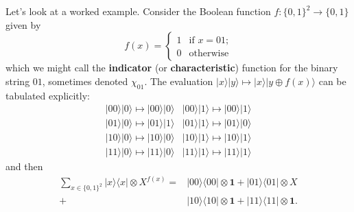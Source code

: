 \documentclass[fleqn,a4paper]{article}
\theoremstyle{definition}
\theoremstyle{definition}
\theoremstyle{definition}
\theoremstyle{definition}
\theoremstyle{remark}
\begin{document}
Let's look at a worked example.
Consider the Boolean function \(f\colon\{0,1\}^2\to\{0,1\}\) given by
\[
  f(x)
  = \begin{cases}
    1 &\text{if $x=01$;}
  \\0 &\text{otherwise}
  \end{cases}
\]
which we might call the \textbf{indicator} (or \textbf{characteristic}) function for the binary string \(01\), sometimes denoted \(\chi_{01}\).
The evaluation \(|x\rangle|y\rangle \mapsto |x\rangle|y\oplus f(x)\rangle\) can be tabulated explicitly:
\[
  \begin{array}{cc}
    |00\rangle|0\rangle \longmapsto |00\rangle|0\rangle
    & |00\rangle|1\rangle \longmapsto |00\rangle|1\rangle
  \\|01\rangle|0\rangle \longmapsto |01\rangle|1\rangle
    & |01\rangle|1\rangle \longmapsto |01\rangle|0\rangle
  \\|10\rangle|0\rangle \longmapsto |10\rangle|0\rangle
    & |10\rangle|1\rangle \longmapsto |10\rangle|1\rangle
  \\|11\rangle|0\rangle \longmapsto |11\rangle|0\rangle
    & |11\rangle|1\rangle \longmapsto |11\rangle|1\rangle
  \end{array}
\]
and then
\[
  \begin{aligned}
    \sum_{x\in\{0,1\}^2} |x\rangle\langle x|\otimes X^{f(x)}
    = &|00\rangle\langle 00| \otimes \mathbf{1}
    + |01\rangle\langle 01| \otimes X
  \\+ &|10\rangle\langle 10| \otimes \mathbf{1}
    + |11\rangle\langle 11| \otimes \mathbf{1}.
  \end{aligned}
\]
\end{document}
